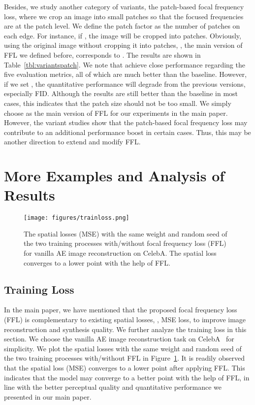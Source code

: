 \documentclass[10pt,twocolumn,letterpaper]{article}
\begin{document}
Besides, we study another category of variants, the patch-based focal frequency loss, where we crop an image into small patches so that the focused frequencies are at the patch level.
We define the patch factor  as the number of patches on each edge. For instance, if , the image will be cropped into  patches. Obviously, using the original image without cropping it into patches, \ie, the main version of FFL we defined before, corresponds to .
The results are shown in Table~\ref{tbl:variantspatch}.
We note that  achieve close performance regarding the five evaluation metrics, all of which are much better than the baseline.
However, if we set , the quantitative performance will degrade from the previous versions, especially FID. Although the results are still better than the baseline in most cases, this indicates that the patch size should not be too small.
We simply choose  as the main version of FFL for our experiments in the main paper.
However, the variant studies show that the patch-based focal frequency loss may contribute to an additional performance boost in certain cases.
Thus, this may be another direction to extend and modify FFL.



\section{More Examples and Analysis of Results}
\label{sec:analysis}


\begin{figure}[t]
	\centering
\texttt{[image: figures/trainloss.png]}
\caption{The spatial losses (MSE) with the same weight and random seed of the two training processes with/without focal frequency loss (FFL) for vanilla AE image reconstruction on CelebA. The spatial loss converges to a lower point with the help of FFL.}
	\label{fig:trainloss}
	\vspace{-0.2cm}
\end{figure}


\subsection{Training Loss}
\label{sec:trainingloss}
In the main paper, we have mentioned that the proposed focal frequency loss (FFL) is complementary to existing spatial losses, \eg, MSE loss, to improve image reconstruction and synthesis quality.
We further analyze the training loss in this section. We choose the vanilla AE image reconstruction task on CelebA~\cite{celeba} for simplicity.
We plot the spatial losses with the same weight and random seed of the two training processes with/without FFL in Figure~\ref{fig:trainloss}.
It is readily observed that the spatial loss (MSE) converges to a lower point after applying FFL.
This indicates that the model may converge to a better point with the help of FFL, in line with the better perceptual quality and quantitative performance we presented in our main paper.
\end{document}
